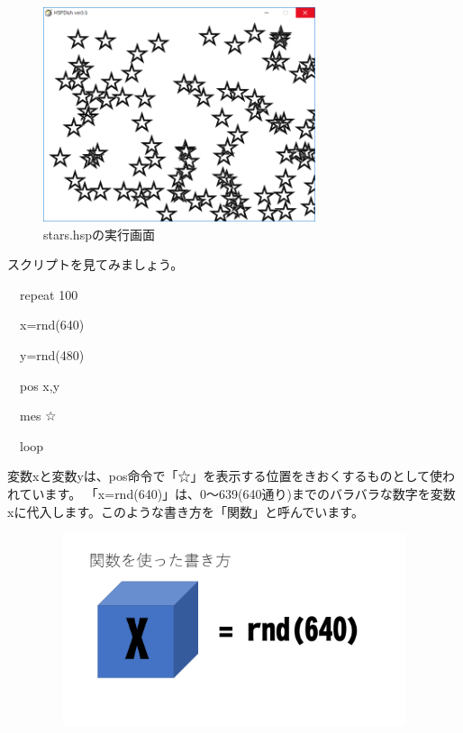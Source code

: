 \begin{figure}[H]
    \begin{center}
        \includegraphics[keepaspectratio,width=7.99cm,height=6.297cm]{text02-img/text02-img047.png}
        \caption{stars.hspの実行画面}
    \end{center}
\end{figure}

スクリプトを見てみましょう。

\begin{description}
    \item \ \ repeat 100
    \item \ \ x=rnd(640)
    \item \ \ y=rnd(480)
    \item \ \ pos x,y
    \item \ \ mes {\textquotedbl}☆{\textquotedbl}
    \item \ \ loop
\end{description}

変数xと変数yは、pos命令で「☆」を表示する位置をきおくするものとして使われています。
「x=rnd(640)」は、0〜639(640通り)までのバラバラな数字を変数xに代入します。このような書き方を「関数」と呼んでいます。

\begin{figure}[H]
    \begin{center}
        \includegraphics[keepaspectratio,width=11.906cm,height=5.662cm]{text02-img/text02-img048.png}
    \end{center}
\end{figure}

